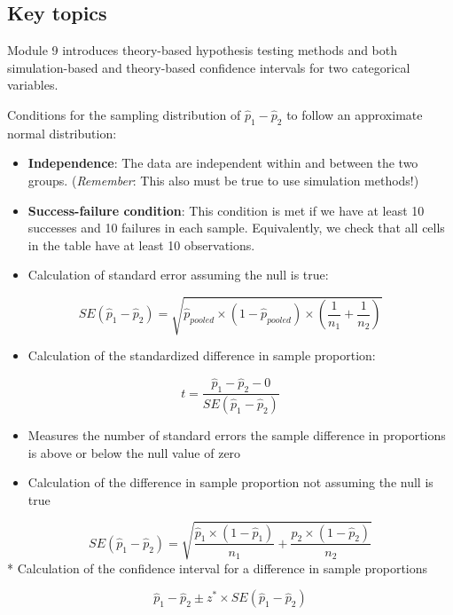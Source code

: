 \documentclass[
]{report}
\providecommand{\tightlist}{%
  \setlength{\itemsep}{0pt}\setlength{\parskip}{0pt}}
\begin{document}
\subsection{Key topics}\label{key-topics-8}

Module 9 introduces theory-based hypothesis testing methods and both simulation-based and theory-based confidence intervals for two categorical variables.

Conditions for the sampling distribution of \(\hat{p}_1-\hat{p}_2\) to follow an approximate normal distribution:

\begin{itemize}
\item
  \textbf{Independence}: The data are independent within and between the two groups. (\emph{Remember}: This also must be true to use simulation methods!)
\item
  \textbf{Success-failure condition}: This condition is met if we have at least 10 successes and 10 failures in each sample. Equivalently, we check that all cells in the table have at least 10 observations.
\item
  Calculation of standard error assuming the null is true:
\end{itemize}

\[SE(\hat{p}_1 - \hat{p}_2) = \sqrt{\hat{p}_{pooled} \times (1-\hat{p}_{pooled}) \times (\frac{1}{n_1}+\frac{1}{n_2})}\]

\begin{itemize}
\tightlist
\item
  Calculation of the standardized difference in sample proportion:
\end{itemize}

\[t = \frac{\hat{p}_1-\hat{p}_2-0}{SE(\hat{p}_1 - \hat{p}_2)}\]

\begin{itemize}
\item
  Measures the number of standard errors the sample difference in proportions is above or below the null value of zero
\item
  Calculation of the difference in sample proportion not assuming the null is true
\end{itemize}

\[SE(\hat{p}_1-\hat{p}_2) = \sqrt{\frac{\hat{p}_1 \times  (1-\hat{p}_1)}{n_1}+\frac{\hat{p}_2 \times  (1-\hat{p}_2)}{n_2}}\]
* Calculation of the confidence interval for a difference in sample proportions

\[\hat{p}_1-\hat{p}_2\pm z^*\times SE(\hat{p}_1-\hat{p}_2)\]
\newpage
\end{document}
